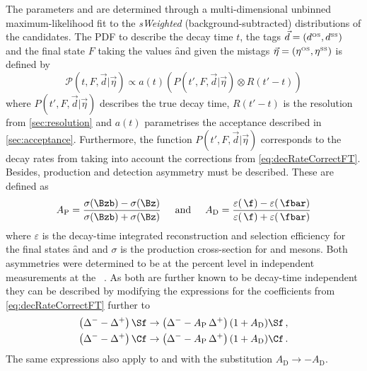 The \CP parameters \Sf and \Sfbar are determined through a multi-dimensional unbinned maximum-likelihood fit to the \emph{sWeighted} (background-subtracted) distributions of the \mbox{\BdToDpi} candidates.
The PDF to describe the decay time $t$, the tags $\vec{d}=(d^{\text{\tiny OS}}, d^{\text{\tiny SS}})$ and the final state $F$ taking the values \f and \fbar given the mistags $\vec{\eta}=(\eta^{\text{\tiny OS}}, \eta^{\text{\tiny SS}})$ is defined by
\begin{equation}
\mathcal{P}(t, F, \vec{d}|\vec{\eta})\propto a(t)\left(P(t', F, \vec{d}|\vec{\eta})\otimes R(t'-t)\right)\label{eq:FinalDecayTimePDF}
\end{equation}
where $P(t', F, \vec{d}|\vec{\eta})$ describes the true decay time, $R(t'-t)$ is the resolution from \cref{sec:resolution} and $a(t)$ parametrises the acceptance described in \cref{sec:acceptance}.
Furthermore, the function $P(t', F, \vec{d}|\vec{\eta})$ corresponds to the decay rates from  taking into account the corrections from \cref{eq:decRateCorrectFT}.
Besides, production and detection asymmetry must be described.
These are defined as
\begin{equation}
A_{\text{P}}=\frac{\sigma(\Bzb)-\sigma(\Bz)}{\sigma(\Bzb)+\sigma(\Bz)}\hspace{0.5cm}\text{and}\hspace{0.5cm}A_{\text{D}}=\frac{\varepsilon(\,\f)-\varepsilon(\,\fbar)}{\varepsilon(\,\f)+\varepsilon(\,\fbar)}
\end{equation}
where $\varepsilon$ is the decay-time integrated reconstruction and selection efficiency for the final states \f and \fbar and $\sigma$ is the production cross-section for \Bz and \Bzb mesons.
Both asymmetries were determined to be at the percent level in independent measurements at the \lhc~\cite{Aaij:2017mso}.
As both are further known to be decay-time independent they can be described by modifying the expressions for the \CP coefficients from \cref{eq:decRateCorrectFT} further to
\begin{equation}
\begin{aligned}
\left(\Delta^--\Delta^+\right)\Sf&\to\left(\Delta^--A_{\text{P}}\,\Delta^+\right)(1+A_{\text{D}})\Sf\,,\\
\left(\Delta^--\Delta^+\right)\Cf&\to\left(\Delta^--A_{\text{P}}\,\Delta^+\right)(1+A_{\text{D}})\Cf\,.
\end{aligned}
\end{equation}
The same expressions also apply to \Sfbar and \Cfbar with the substitution $A_{\text{D}}\to -A_{\text{D}}$.

